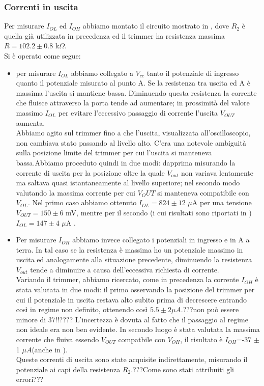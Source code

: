 \subsubsection{Correnti in uscita}
Per misurare $I_{OL}$ ed $I_{OH}$ abbiamo montato il circuito mostrato in , dove $R_2$ è quella già utilizzata in precedenza ed il trimmer ha resistenza massima $R = 102.2 \pm 0.8$ k$\Omega$.\\
Si è operato come segue:
\begin{itemize}
\item per misurare $I_{OL}$ abbiamo collegato a $V_{cc}$ tanto il potenziale di ingresso quanto il potenziale misurato al punto A. 
Se la resistenza tra uscita ed A è massima l'uscita si mantiene bassa. Diminuendo questa resistenza la corrente che fluisce attraverso la porta tende ad aumentare; in prossimità del valore massimo $I_{OL}$ per evitare l'eccessivo passaggio di corrente l'uscita $V_{OUT}$ aumenta.\\
 Abbiamo agito sul trimmer fino a che l'uscita, visualizzata all'oscilloscopio, non cambiava stato passando al livello alto. C'era una notevole ambiguità sulla posizione limite del trimmer per cui l'uscita si manteneva bassa.Abbiamo proceduto quindi in due modi: dapprima misurando la corrente di uscita per la posizione oltre la quale $V_{out}$ non variava lentamente ma saltava quasi istantaneamente al livello superiore; nel secondo modo valutando la massima corrente per cui $V_OUT$ si manteneva compatibile con $V_{OL}$. Nel primo caso abbiamo ottenuto $I_{OL} = 824 \pm 12$ $\mu$A per una tensione $V_{OUT}=150 \pm 6$ mV, mentre per il secondo (i cui risultati sono riportati in ) $I_{OL} = 147 \pm 4$ $\mu$A .
\item Per misurare $I_{OH}$ abbiamo invece collegato i potenziali in ingresso e in A a terra. In tal caso se la resistenza è massima ho un potenziale massimo in uscita ed analogamente alla situazione precedente, diminuendo la resistenza  $V_{out}$ tende a diminuire a causa dell'eccessiva richiesta di corrente. \\
Variando il trimmer, abbiamo ricercato, come in precedenza la corrente $I_{OH}$ è stata valutata in due modi: il primo osservando la posizione del trimmer per cui il potenziale in uscita restava alto subito prima di decrescere entrando così in regime non definito, ottenendo così $5.5\pm 2 \mu A$.???non può essere minore di 37!!???? L'incertezza è dovuta al fatto che il passaggio al regime non ideale era non ben evidente. In secondo luogo è stata valutata la massima corrente che fluiva essendo $V_{OUT}$ compatbile con $V_{OH}$, il risultato è  $I_{OH}$=-37 $\pm$1 $\mu A$(anche in  ).\\
Queste correnti di uscita sono state acquisite indirettamente, misurando il potenziale ai capi della resistenza $R_{2}$.???Come sono stati attribuiti gli errori???
\end{itemize}

